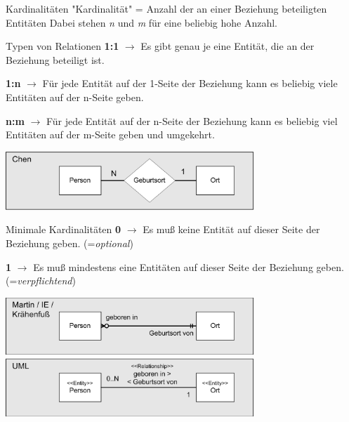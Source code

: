 \begin{frame}[allowframebreaks]{Kardinalitäten}
    "Kardinalität" =  Anzahl der an einer Beziehung beteiligten Entitäten
    Dabei stehen \textit{n} und \textit{m} für eine beliebig hohe Anzahl.

\begin{block}{Typen von Relationen}
 \textbf{1:1} $\to$ Es gibt genau je eine Entität, die an der Beziehung beteiligt ist.
 
 \textbf{1:n} $\to$ Für jede Entität auf der 1-Seite der Beziehung kann es beliebig viele Entitäten auf der n-Seite geben.
 
 \textbf{n:m} $\to$ Für jede Entität auf der n-Seite der Beziehung kann es beliebig viel Entitäten auf der m-Seite geben und umgekehrt.
\end{block}

\begin{center}
  \includegraphics[width=0.7\textwidth]{img/ERD_Darstellungen_Chen.png}
\end{center}

\framebreak
\begin{block}{Minimale Kardinalitäten}
\textbf{0} $\to$ Es muß keine Entität auf dieser Seite der Beziehung geben. (=\textit{optional})

\textbf{1} $\to$ Es muß mindestens eine Entitäten auf dieser Seite der Beziehung geben. (=\textit{verpflichtend})
\end{block}

\begin{center}
    \includegraphics[width=0.7\textwidth]{img/ERD_Darstellungen_Crowfoot.png}
    \includegraphics[width=0.7\textwidth]{img/ERD_Darstellungen_UML.png}
\end{center}

\end{frame}

